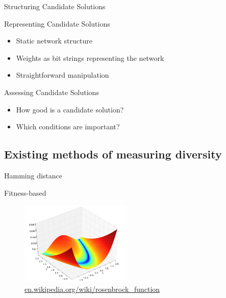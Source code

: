 \begin{frame}{Structuring Candidate Solutions}
  \begin{center}
    
  \end{center}
\end{frame}

\begin{frame}{Representing Candidate Solutions}
  \begin{itemize}
    \item Static network structure
    \item Weights as bit strings representing the network
    \item Straightforward manipulation
  \end{itemize}
\end{frame}

\begin{frame}{Assessing Candidate Solutions}
  \begin{itemize}
    \item How good is a candidate solution?
    \item Which conditions are important?
  \end{itemize}
\end{frame}

\subsection{Existing methods of measuring diversity}

\begin{frame}{Hamming distance}
  
\end{frame}

\begin{frame}{Fitness-based}
  \begin{figure}
    \centering
    \includegraphics[height=150px]{elias/images/elevation.png}
    \caption{\url{en.wikipedia.org/wiki/rosenbrock_function}}
  \end{figure}
\end{frame}

